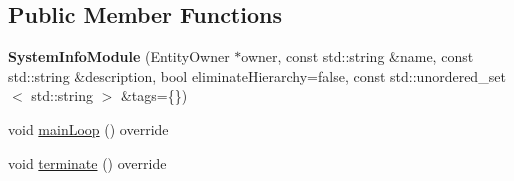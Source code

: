 \subsection*{Public Member Functions}
\begin{DoxyCompactItemize}
\item 
{\bfseries System\+Info\+Module} (Entity\+Owner $\ast$owner, const std\+::string \&name, const std\+::string \&description, bool eliminate\+Hierarchy=false, const std\+::unordered\+\_\+set$<$ std\+::string $>$ \&tags=\{\})\hypertarget{classSystemInfoModule_ab447cebb8cc9cd27cfcd0b1b623684cf}{}\label{classSystemInfoModule_ab447cebb8cc9cd27cfcd0b1b623684cf}

\item 
void \hyperlink{classSystemInfoModule_a876c95c70f1cdf6ffa3f3301f1d1a898}{main\+Loop} () override
\item 
void \hyperlink{classSystemInfoModule_a293bb7cb8a4a0fbd55156251322fa6e2}{terminate} () override
\end{DoxyCompactItemize}
